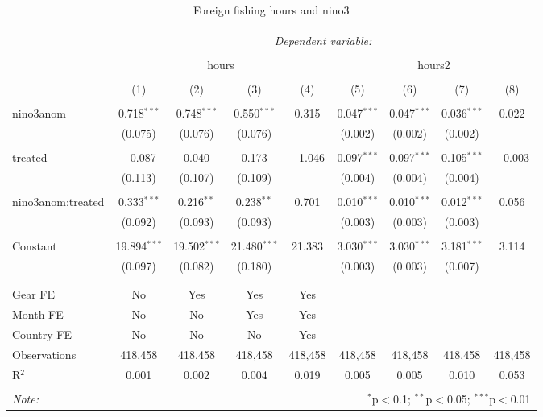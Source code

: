 
\begin{table}[!htbp] \centering 
  \caption{\label{tab:ff_reg}Foreign fishing hours and nino3} 
  \label{} 
\small 
\begin{tabular}{@{\extracolsep{5pt}}lcccccccc} 
\\[-1.8ex]\hline 
\hline \\[-1.8ex] 
 & \multicolumn{8}{c}{\textit{Dependent variable:}} \\ 
\cline{2-9} 
\\[-1.8ex] & \multicolumn{4}{c}{hours} & \multicolumn{4}{c}{hours2} \\ 
\\[-1.8ex] & (1) & (2) & (3) & (4) & (5) & (6) & (7) & (8)\\ 
\hline \\[-1.8ex] 
 nino3anom & 0.718$^{***}$ & 0.748$^{***}$ & 0.550$^{***}$ & 0.315 & 0.047$^{***}$ & 0.047$^{***}$ & 0.036$^{***}$ & 0.022 \\ 
  & (0.075) & (0.076) & (0.076) &  & (0.002) & (0.002) & (0.002) &  \\ 
  & & & & & & & & \\ 
 treated & $-$0.087 & 0.040 & 0.173 & $-$1.046 & 0.097$^{***}$ & 0.097$^{***}$ & 0.105$^{***}$ & $-$0.003 \\ 
  & (0.113) & (0.107) & (0.109) &  & (0.004) & (0.004) & (0.004) &  \\ 
  & & & & & & & & \\ 
 nino3anom:treated & 0.333$^{***}$ & 0.216$^{**}$ & 0.238$^{**}$ & 0.701 & 0.010$^{***}$ & 0.010$^{***}$ & 0.012$^{***}$ & 0.056 \\ 
  & (0.092) & (0.093) & (0.093) &  & (0.003) & (0.003) & (0.003) &  \\ 
  & & & & & & & & \\ 
 Constant & 19.894$^{***}$ & 19.502$^{***}$ & 21.480$^{***}$ & 21.383 & 3.030$^{***}$ & 3.030$^{***}$ & 3.181$^{***}$ & 3.114 \\ 
  & (0.097) & (0.082) & (0.180) &  & (0.003) & (0.003) & (0.007) &  \\ 
  & & & & & & & & \\ 
\hline \\[-1.8ex] 
Gear FE & No & Yes & Yes & Yes &  &  &  &  \\ 
Month FE & No & No & Yes & Yes &  &  &  &  \\ 
Country FE & No & No & No & Yes &  &  &  &  \\ 
Observations & 418,458 & 418,458 & 418,458 & 418,458 & 418,458 & 418,458 & 418,458 & 418,458 \\ 
R$^{2}$ & 0.001 & 0.002 & 0.004 & 0.019 & 0.005 & 0.005 & 0.010 & 0.053 \\ 
\hline 
\hline \\[-1.8ex] 
\textit{Note:}  & \multicolumn{8}{r}{$^{*}$p$<$0.1; $^{**}$p$<$0.05; $^{***}$p$<$0.01} \\ 
\end{tabular} 
\end{table} 

